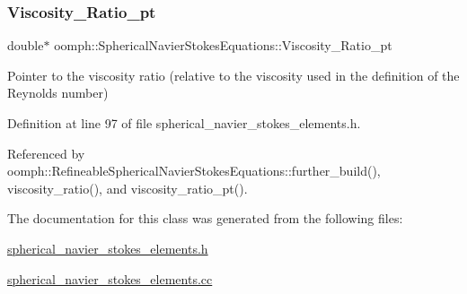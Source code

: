 \subsubsection{\texorpdfstring{Viscosity\+\_\+\+Ratio\+\_\+pt}{Viscosity\_Ratio\_pt}}
{\footnotesize\ttfamily double$\ast$ oomph\+::\+Spherical\+Navier\+Stokes\+Equations\+::\+Viscosity\+\_\+\+Ratio\+\_\+pt\hspace{0.3cm}{\ttfamily [protected]}}



Pointer to the viscosity ratio (relative to the viscosity used in the definition of the Reynolds number) 



Definition at line 97 of file spherical\+\_\+navier\+\_\+stokes\+\_\+elements.\+h.



Referenced by oomph\+::\+Refineable\+Spherical\+Navier\+Stokes\+Equations\+::further\+\_\+build(), viscosity\+\_\+ratio(), and viscosity\+\_\+ratio\+\_\+pt().



The documentation for this class was generated from the following files\+:\begin{DoxyCompactItemize}
\item 
\hyperlink{spherical__navier__stokes__elements_8h}{spherical\+\_\+navier\+\_\+stokes\+\_\+elements.\+h}\item 
\hyperlink{spherical__navier__stokes__elements_8cc}{spherical\+\_\+navier\+\_\+stokes\+\_\+elements.\+cc}\end{DoxyCompactItemize}
